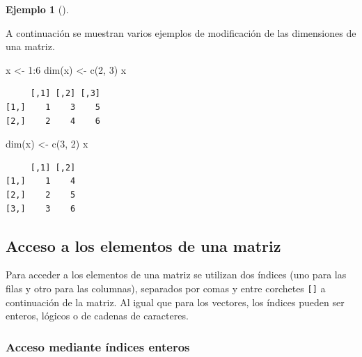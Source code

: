 \documentclass[
  a4paper,
]{scrreport}
\newenvironment{Shaded}{\begin{snugshade}}{\end{snugshade}}
\newcommand{\DecValTok}[1]{\textcolor[rgb]{0.68,0.00,0.00}{#1}}
\newcommand{\FunctionTok}[1]{\textcolor[rgb]{0.28,0.35,0.67}{#1}}
\newcommand{\NormalTok}[1]{\textcolor[rgb]{0.00,0.23,0.31}{#1}}
\newcommand{\OtherTok}[1]{\textcolor[rgb]{0.00,0.23,0.31}{#1}}
\newcommand{\SpecialCharTok}[1]{\textcolor[rgb]{0.37,0.37,0.37}{#1}}
\theoremstyle{definition}
\newtheorem{example}{Ejemplo}[chapter]
\theoremstyle{definition}
\theoremstyle{remark}
\begin{document}
\leavevmode{}%
\begin{example}[]\label{exm-modificacion-dimensiones-matriz}

A continuación se muestran varios ejemplos de modificación de las
dimensiones de una matriz.

\begin{Shaded}
\begin{Highlighting}[]
\NormalTok{x }\OtherTok{\textless{}{-}} \DecValTok{1}\SpecialCharTok{:}\DecValTok{6}
\FunctionTok{dim}\NormalTok{(x) }\OtherTok{\textless{}{-}} \FunctionTok{c}\NormalTok{(}\DecValTok{2}\NormalTok{, }\DecValTok{3}\NormalTok{)}
\NormalTok{x}
\end{Highlighting}
\end{Shaded}

\begin{verbatim}
     [,1] [,2] [,3]
[1,]    1    3    5
[2,]    2    4    6
\end{verbatim}

\begin{Shaded}
\begin{Highlighting}[]
\FunctionTok{dim}\NormalTok{(x) }\OtherTok{\textless{}{-}} \FunctionTok{c}\NormalTok{(}\DecValTok{3}\NormalTok{, }\DecValTok{2}\NormalTok{)}
\NormalTok{x}
\end{Highlighting}
\end{Shaded}

\begin{verbatim}
     [,1] [,2]
[1,]    1    4
[2,]    2    5
[3,]    3    6
\end{verbatim}

\end{example}

\hypertarget{acceso-a-los-elementos-de-una-matriz}{%
\subsection{Acceso a los elementos de una
matriz}\label{acceso-a-los-elementos-de-una-matriz}}

Para acceder a los elementos de una matriz se utilizan dos índices (uno
para las filas y otro para las columnas), separados por comas y entre
corchetes \texttt{{[}{]}} a continuación de la matriz. Al igual que para
los vectores, los índices pueden ser enteros, lógicos o de cadenas de
caracteres.

\hypertarget{acceso-mediante-uxedndices-enteros}{%
\subsubsection{Acceso mediante índices
enteros}\label{acceso-mediante-uxedndices-enteros}}
\end{document}
